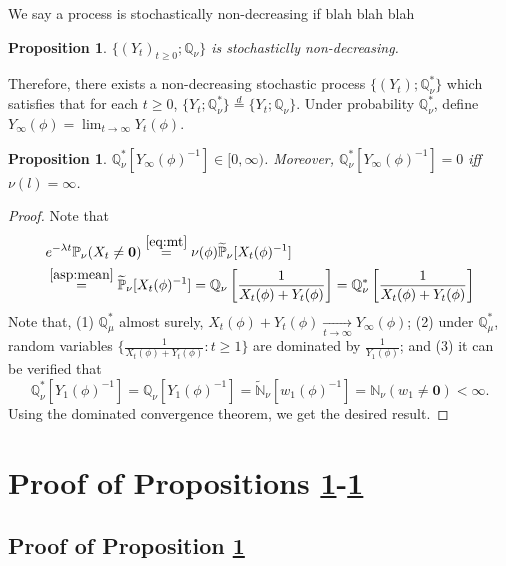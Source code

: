 \documentclass[12pt,a4paper]{amsart}
\numberwithin{equation}{section}
\theoremstyle{plain}
\newtheorem{prop}[thm]{Proposition}
\theoremstyle{definition}
\theoremstyle{remark}
\begin{document}
{\color{blue} We say a process is stochastically non-decreasing if blah blah blah }

\begin{prop} \label{thm:sn}
	$\{(Y_t)_{t\geq 0}; \mathbb Q_\nu \}$ is stochasticlly non-decreasing.
\end{prop}

Therefore, there exists a non-decreasing stochastic process $\{(Y_t); \mathbb Q^*_\nu\}$ which satisfies that for each $t\geq 0$, $\{Y_t; \mathbb Q^*_\nu\} \overset{d} = \{Y_t; \mathbb Q_\nu\}$. 
	Under probability $\mathbb Q^*_\nu$, define $Y_\infty(\phi) = \lim_{t\to \infty} Y_t(\phi)$.

\begin{prop} \color{red} \label{thm:ii}
	$\mathbb Q^*_\nu[Y_\infty(\phi)^{-1}] \in[0,\infty)$. Moreover, $\mathbb Q^*_\nu[Y_\infty(\phi)^{-1}] = 0$ iff $\nu(l) = \infty$.
\end{prop}

\begin{proof} 
	\color{blue}
	Note that
\begin{align}
	&e^{-\lambda t}\mathbb P_\nu(X_t \neq \mathbf 0)
	\overset{\eqref{eq:mt}}= \nu(\phi)\widetilde{\mathbb P}_\nu [X_t(\phi)^{-1}]
	\\ & \overset{\eqref{asp:mean}}= \widetilde{\mathbb P}_\nu [X_t(\phi)^{-1}]
	=\mathbb Q_{\nu}\left[\frac{1}{X_t(\phi) + Y_t(\phi)} \right]
	=\mathbb Q^*_{\nu}\left[\frac{1}{X_t(\phi) + Y_t(\phi)} \right]
\end{align}
	Note that, (1) $\mathbb Q^*_\mu$ almost surely, $X_t(\phi)+Y_t(\phi) \xrightarrow[t\to \infty]{} Y_\infty(\phi)$; (2) under $\mathbb Q^*_\mu$, random variables $\{\frac{1}{X_t(\phi) + Y_t(\phi)}: t\geq 1\}$ are dominated by $\frac{1}{Y_1(\phi)}$; and (3) it can be verified that
\[
	\mathbb Q_\nu^*[Y_1(\phi)^{-1}] 
	= \mathbb Q_\nu [Y_1(\phi)^{-1}] 
	= \widetilde {\mathbb N}_\nu [w_1(\phi)^{-1}]
	= \mathbb N_\nu (w_1\neq \mathbf 0) < \infty.
\]
	Using the dominated convergence theorem, we get the desired result.
\end{proof}

\section{Proof of Propositions \ref{thm:sn}-\ref{thm:ii}}
\subsection{Proof of Proposition \ref{thm:sn}}
\end{document}
